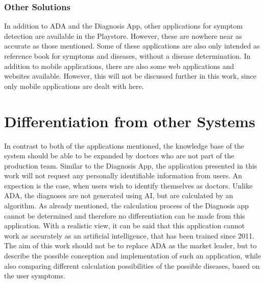 \subsubsection{Other Solutions}
In addition to ADA and the Diagnosis App, other applications for symptom detection are available in the Playstore. However, these are nowhere near as accurate as those mentioned. Some of these applications are also only intended as reference book for symptoms and diseases, without a disease determination. In addition to mobile applications, there are also some web applications and websites available. However, this will not be discussed further in this work, since only mobile applications are dealt with here.

\section{Differentiation from other Systems}
In contrast to both of the applications mentioned, the knowledge base of the system should be able to be expanded by doctors who are not part of the production team. Similar to the Diagnosis App, the application presented in this work will not request any personally identifiable information from users. An expection is the case, when users wish to identify themselves as doctors. Unlike ADA, the diagnoses are not generated using AI, but are calculated by an algorithm. As already mentioned, the calculation process of the Diagnosis app cannot be determined and therefore no differentiation can be made from this application. With a realistic view, it can be said that this application cannot work as accurately as an artificial intelligence, that has been trained since 2011.  The aim of this work should not be to replace ADA as the market leader, but to describe the possible conception and implementation of such an application, while also comparing different calculation possibilities of the possible diseases, based on the user symptoms.




